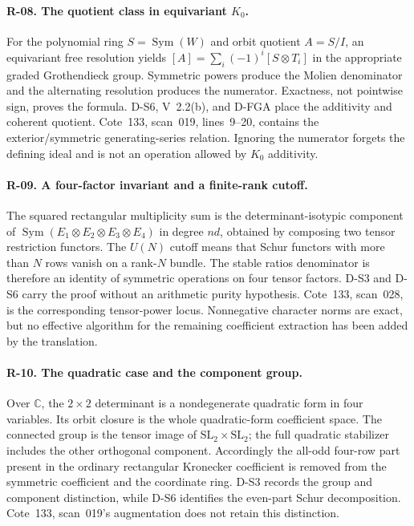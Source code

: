 \documentclass[11pt,a4paper]{article}
\theoremstyle{definition}\newtheorem{definition}{Definition}
\begin{document}
\paragraph{R-08. The quotient class in equivariant $K_0$.}
For the polynomial ring $S=\operatorname{Sym}(W)$ and orbit quotient $A=S/I$, an equivariant free resolution yields $[A]=\sum_i(-1)^i[S\otimes T_i]$ in the appropriate graded Grothendieck group. Symmetric powers produce the Molien denominator and the alternating resolution produces the numerator. Exactness, not pointwise sign, proves the formula. D-S6, V~2.2(b), and D-FGA place the additivity and coherent quotient. Cote~133, scan~019, lines~9--20, contains the exterior/symmetric generating-series relation. Ignoring the numerator forgets the defining ideal and is not an operation allowed by $K_0$ additivity.

\paragraph{R-09. A four-factor invariant and a finite-rank cutoff.}
The squared rectangular multiplicity sum is the determinant-isotypic component of $\operatorname{Sym}(E_1\otimes E_2\otimes E_3\otimes E_4)$ in degree $nd$, obtained by composing two tensor restriction functors. The $U(N)$ cutoff means that Schur functors with more than $N$ rows vanish on a rank-$N$ bundle. The stable ratios denominator is therefore an identity of symmetric operations on four tensor factors. D-S3 and D-S6 carry the proof without an arithmetic purity hypothesis. Cote~133, scan~028, is the corresponding tensor-power locus. Nonnegative character norms are exact, but no effective algorithm for the remaining coefficient extraction has been added by the translation.

\paragraph{R-10. The quadratic case and the component group.}
Over $\mathbb C$, the $2\times2$ determinant is a nondegenerate quadratic form in four variables. Its orbit closure is the whole quadratic-form coefficient space. The connected group is the tensor image of $\mathrm{SL}_2\times\mathrm{SL}_2$; the full quadratic stabilizer includes the other orthogonal component. Accordingly the all-odd four-row part present in the ordinary rectangular Kronecker coefficient is removed from the symmetric coefficient and the coordinate ring. D-S3 records the group and component distinction, while D-S6 identifies the even-part Schur decomposition. Cote~133, scan~019's augmentation does not retain this distinction.
\end{document}
